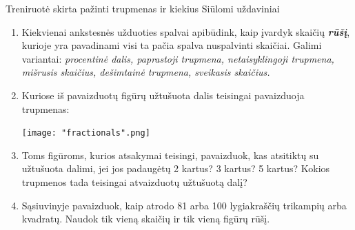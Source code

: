 \documentclass{article}
\begin{document}
\begin{mybox}{Treniruotė skirta pažinti trupmenas ir kiekius}
Siūlomi uždaviniai
\begin{enumerate}
\item Kiekvienai ankstesnės užduoties spalvai apibūdink, kaip įvardyk skaičių \textbf{\textit{rūšį}}, kurioje yra pavadinami visi ta pačia spalva nuspalvinti skaičiai. Galimi variantai: \textit{procentinė dalis, paprastoji trupmena, netaisyklingoji trupmena, mišrusis skaičius, dešimtainė trupmena, sveikasis skaičius.}
\item Kuriose iš pavaizduotų figūrų užtušuota dalis teisingai pavaizduoja trupmenas:

\texttt{[image: "fractionals".png]}
\item Toms figūroms, kurios atsakymai teisingi, pavaizduok, kas atsitiktų su užtušuota dalimi, jei jos padaugėtų 2 kartus? 3 kartus? 5 kartus? Kokios trupmenos tada teisingai atvaizduotų užtušuotą dalį?
\item Sąsiuvinyje pavaizduok, kaip atrodo 81 arba 100 lygiakraščių trikampių arba kvadratų. Naudok tik vieną skaičių ir tik vieną figūrų rūšį.
\end{enumerate}
\end{mybox}
\end{document}
